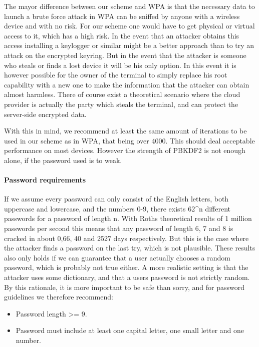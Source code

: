 \documentclass[pdftex,english,10pt,b5paper,twoside]{book}
\begin{document}
The mayor difference between our scheme and WPA is that the necessary data to
launch a brute force attack in WPA can be sniffed by anyone with a wireless
device and with no risk. For our scheme one would have to get physical or
virtual access to it, which has a high risk. In the event that an attacker
obtains this access installing a keylogger or similar might be a better
approach than to try an attack on the encrypted keyring. But in the event that
the attacker is someone who steals or finds a lost device it will be his only
option. In this event it is however possible for the owner of the terminal to
simply replace his root capability with a new one to make the information that
the attacker can obtain almost harmless. There of course exist a theoretical
scenario where the cloud provider is actually the party which steals the
terminal, and can protect the server-side encrypted data.

With this in mind, we recommend at least the same amount of iterations
to be used in our scheme as in WPA, that being over 4000. This should deal
acceptable performance on most devices. However the strength of \ac{PBKDF2} is
not enough alone, if the password used is to weak.

\paragraph{Password requirements}

If we assume every password can only consist of the English letters, both
uppercase and lowercase, and the numbers 0-9, there exists 62^n different
passwords for a password of length n. With Roths theoretical results of 1
million passwords per second this means that any password of length 6, 7 and 8
is cracked in about 0,66, 40 and 2527 days respectively. But this is the case
where the attacker finds a password on the last try, which is not plausible.
These results also only holds if we can guarantee that a user actually chooses
a random password, which is probably not true either. A more realistic setting
is that the attacker uses some dictionary, and that a users password is not
strictly random. By this rationale, it is more important to be safe than sorry,
and for password guidelines we therefore recommend:

\begin{itemize}
\item Password length >= 9.
\item Password must include at least one capital letter, one small letter and
one number.
\end{itemize}
\end{document}
